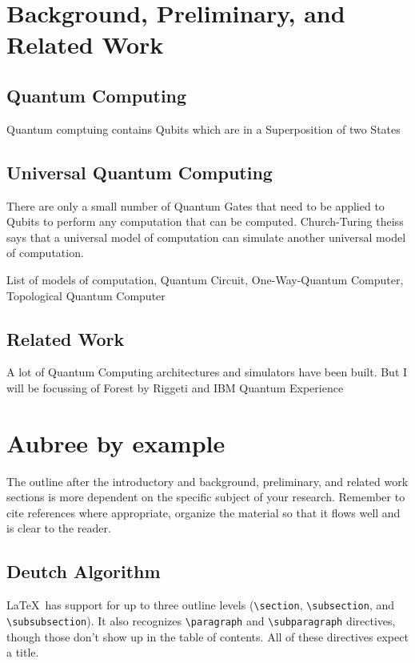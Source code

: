 \documentclass{article}
\begin{document}
\section{Background, Preliminary, and Related Work}
\subsection{Quantum Computing}
Quantum comptuing contains Qubits which are in a Superposition of two States

\subsection{Universal Quantum Computing}
There are only a small number of Quantum Gates that need to be applied to Qubits to perform any computation that can be computed. Church-Turing theiss says that a universal model of computation can simulate another universal model of computation.

List of models of computation, Quantum Circuit, One-Way-Quantum Computer, Topological Quantum Computer

\subsection{Related Work}
A lot of Quantum Computing architectures and simulators have been built. But I will be focussing of Forest by Riggeti and IBM Quantum Experience 
\pagebreak

\section{Aubree by example}

The outline after the introductory and background, preliminary, and related work sections is more dependent on the specific subject of your research.  Remember to cite references where appropriate, organize the material so that it flows well and is clear to the reader.

\subsection{Deutch Algorithm}

\LaTeX\ has support for up to three outline levels (\verb!\section!, \verb!\subsection!, and \verb!\subsubsection!).  It also recognizes \verb!\paragraph! and \verb!\subparagraph! directives, though those don't show up in the table of contents.  All of these directives expect a title.
\end{document}
